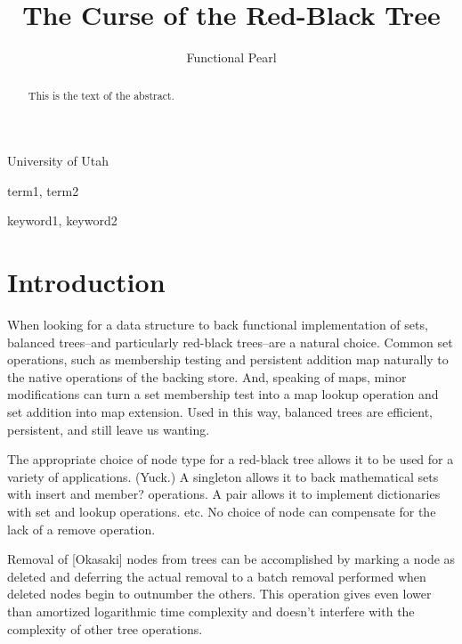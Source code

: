 \documentclass[preprint]{sigplanconf}
\begin{document}
\copyrightdata{[to be supplied]} 


\title{The Curse of the Red-Black Tree}
\subtitle{Functional Pearl}

           {University of Utah}

\maketitle

\begin{abstract}
This is the text of the abstract.
\end{abstract}


\terms
term1, term2

\keywords
keyword1, keyword2

\section{Introduction}

When looking for a data structure to back functional implementation of sets, balanced trees--and particularly red-black trees--are a natural choice. Common set operations, such as membership testing and persistent addition map naturally to the native operations of the backing store. And, speaking of maps, minor modifications can turn a set membership test into a map lookup operation and set addition into map extension. Used in this way, balanced trees are efficient, persistent, and still leave us wanting.




The appropriate choice of node type for a red-black tree allows it to be used for a variety of applications. (Yuck.) A singleton allows it to back mathematical sets with insert and member? operations. A pair allows it to implement dictionaries with set and lookup operations. etc. No choice of node can compensate for the lack of a remove operation.

Removal of [Okasaki] nodes from trees can be accomplished by marking a node as deleted and deferring the actual removal to a batch removal performed when deleted nodes begin to outnumber the others. This operation gives even lower than amortized logarithmic time complexity and doesn't interfere with the complexity of other tree operations.
\end{document}
